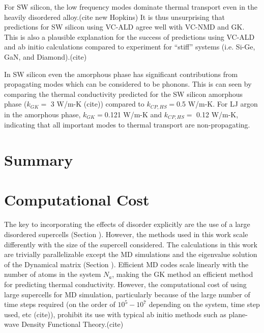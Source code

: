 \documentclass[aps,prb,onecolumn,preprint,superscriptaddress,amsmath,amssymb,floatfix]{revtex4}
\begin{document}
For SW silicon, the low frequency modes dominate thermal transport 
even in the heavily disordered alloy.(cite new Hopkins) 
It is thus unsurprising that predictions for 
SW silicon using VC-ALD agree well with VC-NMD and GK. This is also a 
plausible explanation for the success of predictions using 
VC-ALD and ab initio calculations compared to experiment for 
``stiff'' systems (i.e. Si-Ge, GaN, and Diamond).(cite)

In SW silicon even the amorphous phase has significant contributions 
from propagating modes which can be considered to be phonons. This is 
can seen by comparing the thermal conductivity predicted for the 
SW silicon amorphous phase ($k_{GK} =$ 3 W/m-K (cite)) compared to 
$k_{CP,HS} = $0.5 W/m-K.  For LJ argon in the amorphous phase, 
$k_{GK} = $0.121 W/m-K and $k_{CP,HS} =$ 0.12 W/m-K, indicating that 
all important modes to thermal transport are non-propagating.

\section{\label{S:}Summary}



\appendix

\section{\label{A:Computational Cost}
Computational Cost}

The key to incorporating the effects of disorder explicitly are the use 
of a large disordered supercells (Section ).  However, the methods used 
in this work scale differently with the size of the supercell considered. 
The calculations in this work are trivially parallelizable\cite{} 
except the 
MD simulations\cite{plimpton_fast_1995} and the eigenvalue solution of the 
Dynamical matrix (Section ).\cite{gale_general_2003} Efficient MD 
codes scale linearly with the number of atoms in the system $N_a$, making 
the GK method an efficient method for predicting thermal conductivity. 
However, the computational cost of using large supercells for MD simulation, 
particularly because of the large number of time steps required 
(on the order of $10^5 - 10^7$ depending on the 
system, time step used, etc (cite)), prohibit its use with typical 
ab initio methods such as plane-wave Density Functional Theory.(cite) 
\end{document}
